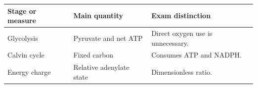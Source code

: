 \documentclass[12pt,a4paper]{article}
\begin{document}
\begin{tcolorbox}[tikzbox, title={Summary Comparison}]
\par\vspace{5pt}
\begingroup
\setlength{\extrarowheight}{1pt}
\noindent\begin{tabularx}{\linewidth}{|B{3.45cm}|Y|Y|}
\hline
\textbf{Stage or measure} & \textbf{Main quantity} & \textbf{Exam distinction} \\ \hline
Glycolysis & Pyruvate and net ATP & Direct oxygen use is unnecessary. \\ \hline
Calvin cycle & Fixed carbon & Consumes ATP and NADPH. \\ \hline
Energy charge & Relative adenylate state & Dimensionless ratio. \\ \hline
\end{tabularx}\par
\endgroup
\end{tcolorbox}
\end{document}
